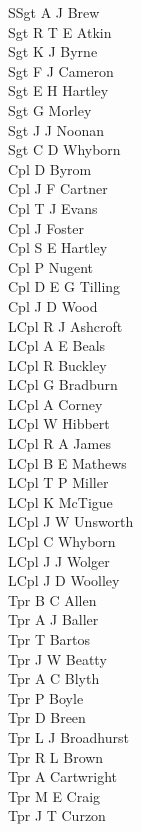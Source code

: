 \begin{multicols}{4}
  \scriptsize
  \noindent
  SSgt A J Brew \\
  Sgt R T E Atkin \\
  Sgt K J Byrne \\
  Sgt F J Cameron \\
  Sgt E H Hartley \\
  Sgt G Morley \\
  Sgt J J Noonan \\
  Sgt C D Whyborn \\
  Cpl D Byrom \\
  Cpl J F Cartner \\
  Cpl T J Evans \\
  Cpl J Foster \\
  Cpl S E Hartley \\
  Cpl P Nugent \\
  Cpl D E G Tilling \\
  Cpl J D Wood \\
  LCpl R J Ashcroft \\
  LCpl A E Beals \\
  LCpl R Buckley \\
  LCpl G Bradburn \\
  LCpl A Corney \\
  LCpl W Hibbert \\
  LCpl R A James \\
  LCpl B E Mathews \\
  LCpl T P Miller \\
  LCpl K McTigue \\
  LCpl J W Unsworth \\
  LCpl C Whyborn \\
  LCpl J J Wolger \\
  LCpl J D Woolley \\
  Tpr B C Allen \\
  Tpr A J Baller \\
  Tpr T Bartos \\
  Tpr J W Beatty \\
  Tpr A C Blyth \\
  Tpr P Boyle \\
  Tpr D Breen \\
  Tpr L J Broadhurst \\
  Tpr R L Brown \\
  Tpr A Cartwright \\
  Tpr M E Craig \\
  Tpr J T Curzon \\

\end{multicols}
